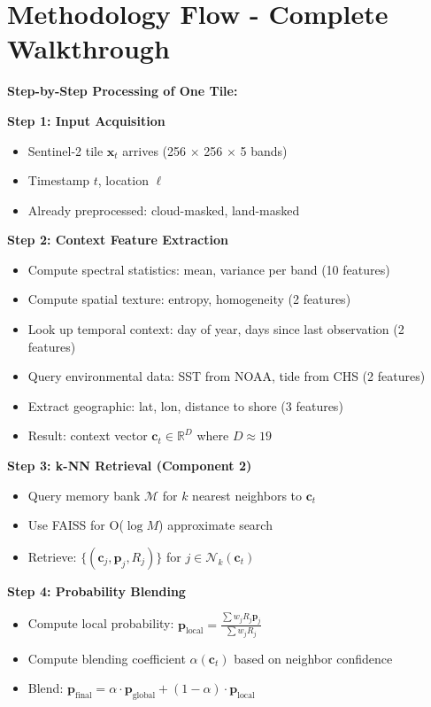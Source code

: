 \documentclass[11pt]{article}
\begin{document}
\section{Methodology Flow - Complete Walkthrough}

\textbf{Step-by-Step Processing of One Tile:}

\textbf{Step 1: Input Acquisition}
\begin{itemize}
    \item Sentinel-2 tile $\mathbf{x}_t$ arrives (256 $\times$ 256 $\times$ 5 bands)
    \item Timestamp $t$, location $\ell$
    \item Already preprocessed: cloud-masked, land-masked
\end{itemize}

\textbf{Step 2: Context Feature Extraction}
\begin{itemize}
    \item Compute spectral statistics: mean, variance per band (10 features)
    \item Compute spatial texture: entropy, homogeneity (2 features)
    \item Look up temporal context: day of year, days since last observation (2 features)
    \item Query environmental data: SST from NOAA, tide from CHS (2 features)
    \item Extract geographic: lat, lon, distance to shore (3 features)
    \item Result: context vector $\mathbf{c}_t \in \mathbb{R}^{D}$ where $D \approx 19$
\end{itemize}

\textbf{Step 3: k-NN Retrieval (Component 2)}
\begin{itemize}
    \item Query memory bank $\mathcal{M}$ for $k$ nearest neighbors to $\mathbf{c}_t$
    \item Use FAISS for O($\log M$) approximate search
    \item Retrieve: $\{(\mathbf{c}_j, \mathbf{p}_j, R_j)\}$ for $j \in \mathcal{N}_k(\mathbf{c}_t)$
\end{itemize}

\textbf{Step 4: Probability Blending}
\begin{itemize}
    \item Compute local probability: $\mathbf{p}_{\text{local}} = \frac{\sum w_j R_j \mathbf{p}_j}{\sum w_j R_j}$
    \item Compute blending coefficient $\alpha(\mathbf{c}_t)$ based on neighbor confidence
    \item Blend: $\mathbf{p}_{\text{final}} = \alpha \cdot \mathbf{p}_{\text{global}} + (1-\alpha) \cdot \mathbf{p}_{\text{local}}$
\end{itemize}
\end{document}
